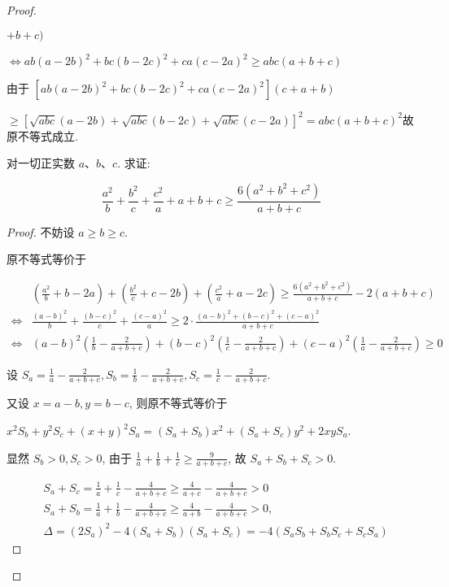 \begin{proof}
\begin{example}
\begin{note}
	$+b+c)$
	
	$\Leftrightarrow a b(a-2 b)^{2}+b c(b-2 c)^{2}+c a(c-2 a)^{2} \geqslant a b c(a+b+c)$
	
	由于 $\left[a b(a-2 b)^{2}+b c(b-2 c)^{2}+c a(c-2 a)^{2}\right](c+a+b)$
	
	$\geqslant[\sqrt{a b c}(a-2 b)+\sqrt{a b c}(b-2 c)+\sqrt{a b c}(c-2 a)]^{2}=a b c(a+b+c)^{2}$故原不等式成立.
\end{note}

\begin{example}
	对一切正实数 $a 、 b 、 c$. 求证:
	
	$$
	\frac{a^{2}}{b}+\frac{b^{2}}{c}+\frac{c^{2}}{a}+a+b+c \geqslant \frac{6\left(a^{2}+b^{2}+c^{2}\right)}{a+b+c}
	$$
\end{example}
\begin{proof}
	不妨设 $a \geqslant b \geqslant c$.
	
	原不等式等价于
	
	$$
	\begin{aligned}
	& \left(\frac{a^{2}}{b}+b-2 a\right)+\left(\frac{b^{2}}{c}+c-2 b\right)+\left(\frac{c^{2}}{a}+a-2 c\right) \geqslant \frac{6\left(a^{2}+b^{2}+c^{2}\right)}{a+b+c}-2(a+b+c) \\
	\Leftrightarrow & \frac{(a-b)^{2}}{b}+\frac{(b-c)^{2}}{c}+\frac{(c-a)^{2}}{a} \geqslant 2 \cdot \frac{(a-b)^{2}+(b-c)^{2}+(c-a)^{2}}{a+b+c} \\
	\Leftrightarrow & (a-b)^{2}\left(\frac{1}{b}-\frac{2}{a+b+c}\right)+(b-c)^{2}\left(\frac{1}{c}-\frac{2}{a+b+c}\right)+(c-a)^{2}\left(\frac{1}{a}-\frac{2}{a+b+c}\right) \geqslant 0
	\end{aligned}
	$$
	
	设 $S_{a}=\frac{1}{a}-\frac{2}{a+b+c}, S_{b}=\frac{1}{b}-\frac{2}{a+b+c}, S_{c}=\frac{1}{c}-\frac{2}{a+b+c}$.
	
	又设 $x=a-b, y=b-c$, 则原不等式等价于
	
	$x^{2} S_{b}+y^{2} S_{c}+(x+y)^{2} S_{a}=\left(S_{a}+S_{b}\right) x^{2}+\left(S_{a}+S_{c}\right) y^{2}+2 x y S_{a}$.
	
	显然 $S_{b}>0, S_{c}>0$, 由于 $\frac{1}{a}+\frac{1}{b}+\frac{1}{c} \geqslant \frac{9}{a+b+c}$, 故 $S_{a}+S_{b}+S_{c}>0$.
	
	$$
	\begin{aligned}
	& S_{a}+S_{c}=\frac{1}{a}+\frac{1}{c}-\frac{4}{a+b+c} \geqslant \frac{4}{a+c}-\frac{4}{a+b+c}>0 \\
	& S_{a}+S_{b}=\frac{1}{a}+\frac{1}{b}-\frac{4}{a+b+c} \geqslant \frac{4}{a+b}-\frac{4}{a+b+c}>0, \\
	& \Delta=\left(2 S_{a}\right)^{2}-4\left(S_{a}+S_{b}\right)\left(S_{a}+S_{c}\right)=-4\left(S_{a} S_{b}+S_{b} S_{c}+S_{c} S_{a}\right)
	\end{aligned}
	$$
	

\end{proof}
\end{example}
\end{proof}
